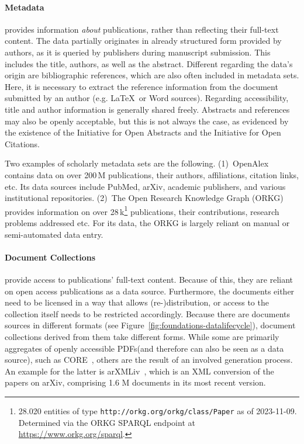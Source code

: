 \paragraph{Metadata}
provides information \emph{about} publications, rather than reflecting their full-text content. The data partially originates in already structured form provided by authors, as it is queried by publishers during manuscript submission. This includes the title, authors, as well as the abstract. Different regarding the data's origin are bibliographic references, which are also often included in metadata sets. Here, it is necessary to extract the reference information from the document submitted by an author (e.g. \LaTeX\ or Word sources). Regarding accessibility, title and author information is generally shared freely. Abstracts and references may also be openly acceptable, but this is not always the case, as evidenced by the existence of the Initiative for Open Abstracts and the Initiative for Open Citations.


Two examples of scholarly metadata sets are the following. (1)~OpenAlex~\cite{openalex} contains data on over 200\,M publications, their authors, affiliations, citation links, etc. Its data sources include PubMed, arXiv, academic publishers, and various institutional repositories.%
 (2)~The Open Research Knowledge Graph (ORKG)~\cite{orkg1,orkg2} provides information on over 28\,k\footnote{28.020 entities of type \texttt{http://orkg.org/orkg/class/Paper} as of 2023-11-09. Determined via the ORKG SPARQL endpoint at \url{https://www.orkg.org/sparql}.} publications, their contributions, research problems addressed etc. For its data, the ORKG is largely reliant on manual or semi-automated data entry.

\paragraph{Document Collections} provide access to publications' full-text content. Because of this, they are reliant on open access publications as a data source. Furthermore, the documents either need to be licensed in a way that allows (re-)distribution, or access to the collection itself needs to be restricted accordingly. Because there are documents sources in different formats (see Figure~\ref{fig:foundations-datalifecycle}), document collections derived from them take different forms. While some are primarily aggregates of openly accessible PDFs(and therefore can also be seen as a data source), such as CORE~\cite{core}, others are the result of an involved generation process. An example for the latter is arXMLiv~\cite{arXMLiv}, which is an XML conversion of the papers on arXiv, comprising 1.6 M documents in its most recent version.

